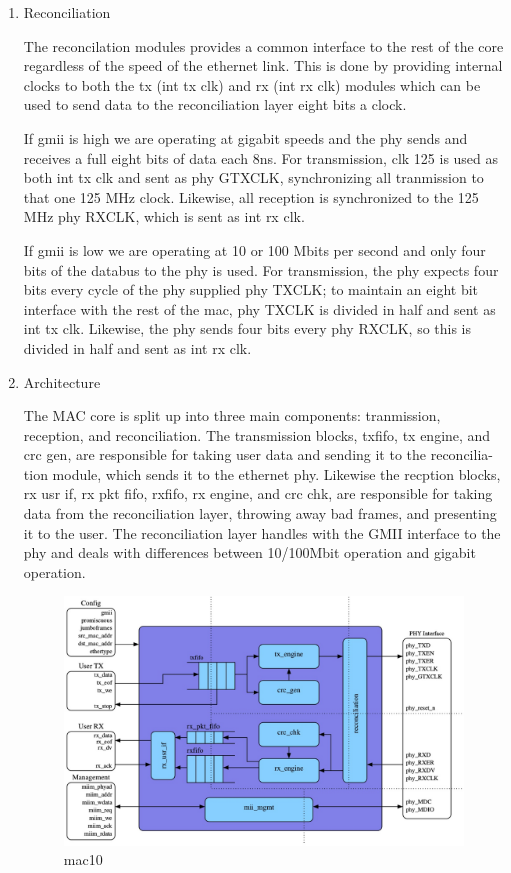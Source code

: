 \begin{enumerate}
\item Reconciliation

The reconcilation modules provides a common interface to the rest of the core regardless of the speed of the ethernet link. This is done by providing internal clocks to both the tx (int tx clk) and rx (int rx clk) modules which can be used to send data to the reconciliation layer eight bits a clock.

If gmii is high we are operating at gigabit speeds and the phy sends and receives a full eight bits of data each 8ns. For transmission, clk 125 is used as both int tx clk and sent as phy GTXCLK, synchronizing all tranmission to that one 125 MHz clock. Likewise, all reception is synchronized to the 125 MHz phy RXCLK, which is sent as int rx clk.

If gmii is low we are operating at 10 or 100 Mbits per second and only four bits of the databus to the phy is used. For transmission, the phy expects four bits every cycle of the phy supplied phy TXCLK; to maintain an eight bit interface with the rest of the mac, phy TXCLK is divided in half and sent as int tx clk. Likewise, the phy sends four bits every phy RXCLK, so this is divided in half and sent as int rx clk.


\item Architecture

The MAC core is split up into three main components: tranmission, reception, and reconciliation. The transmission blocks, txfifo, tx engine, and crc gen, are responsible for taking user data and sending it to the reconcilia- tion module, which sends it to the ethernet phy. Likewise the recption blocks, rx usr if, rx pkt fifo, rxfifo, rx engine, and crc chk, are responsible for taking data from the reconciliation layer, throwing away bad frames, and presenting it to the user. The reconciliation layer handles with the GMII interface to the phy and deals with differences between 10/100Mbit operation and gigabit operation.

\begin{figure}[ht!]
\centering
\includegraphics[scale=0.25]{eps/mac10.eps}
\caption{mac10}
\label{mac10}
\end{figure}

\end{enumerate}


